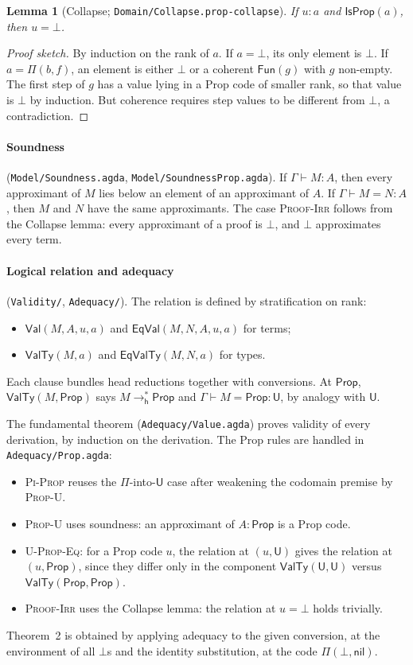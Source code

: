\documentclass[11pt]{article}
\newcommand{\U}{\mathsf{U}}
\newcommand{\Prop}{\mathsf{Prop}}
\newcommand{\ty}[3]{#1 \vdash #2 : #3}
\newcommand{\cv}[4]{#1 \vdash #2 = #3 : #4}
\newcommand{\hr}{\mathrel{\to^{*}_{\mathsf{h}}}}
\newcommand{\code}[1]{\mathsf{#1}}
\newcommand{\IsProp}{\mathsf{IsProp}}
\newcommand{\agda}[1]{\texttt{#1}}
\theoremstyle{plain}
\newtheorem{lemma}[theorem]{Lemma}
\theoremstyle{remark}
\begin{document}
\begin{lemma}[Collapse; \agda{Domain/Collapse.prop-collapse}]
If $u : a$ and $\IsProp(a)$, then $u = \bot$.
\end{lemma}
\begin{proof}[Proof sketch]
By induction on the rank of $a$. If $a = \bot$, its only element is $\bot$.
If $a = \Pi(b, f)$, an element is either $\bot$ or a coherent $\code{Fun}(g)$
with $g$ non-empty. The first step of $g$ has a value lying in a Prop code of
smaller rank, so that value is $\bot$ by induction. But coherence requires
step values to be different from $\bot$, a contradiction.
\end{proof}

\paragraph{Soundness} (\agda{Model/Soundness.agda}, \agda{Model/SoundnessProp.agda}).
If $\ty{\Gamma}{M}{A}$, then every approximant of $M$ lies below an element
of an approximant of $A$. If $\cv{\Gamma}{M}{N}{A}$, then $M$ and $N$ have the
same approximants. The case \textsc{Proof-Irr} follows from the Collapse
lemma: every approximant of a proof is $\bot$, and $\bot$ approximates
every term.

\paragraph{Logical relation and adequacy}
(\agda{Validity/}, \agda{Adequacy/}). The relation is defined by
stratification on rank:
\begin{itemize}
\item $\mathsf{Val}(M, A, u, a)$ and $\mathsf{EqVal}(M, N, A, u, a)$ for terms;
\item $\mathsf{ValTy}(M, a)$ and $\mathsf{EqValTy}(M, N, a)$ for types.
\end{itemize}
Each clause bundles head reductions together with conversions. At
$\code{Prop}$, $\mathsf{ValTy}(M, \code{Prop})$ says $M \hr \Prop$ and
$\cv{\Gamma}{M}{\Prop}{\U}$, by analogy with $\code{U}$.

The fundamental theorem (\agda{Adequacy/Value.agda}) proves validity of every
derivation, by induction on the derivation. The Prop rules are handled in
\agda{Adequacy/Prop.agda}:
\begin{itemize}
\item \textsc{Pi-Prop} reuses the $\Pi$-into-$\U$ case after weakening the
  codomain premise by \textsc{Prop-U}.
\item \textsc{Prop-U} uses soundness: an approximant of $A : \Prop$ is a
  Prop code.
\item \textsc{U-Prop-Eq}: for a Prop code $u$, the relation at
  $(u, \code{U})$ gives the relation at $(u, \code{Prop})$, since they
  differ only in the component $\mathsf{ValTy}(\U,\code{U})$ versus
  $\mathsf{ValTy}(\Prop,\code{Prop})$.
\item \textsc{Proof-Irr} uses the Collapse lemma: the relation at $u = \bot$
  holds trivially.
\end{itemize}
Theorem~2 is obtained by applying adequacy to the given conversion, at the
environment of all $\bot$s and the identity substitution, at the code
$\Pi(\bot, \mathsf{nil})$.
\end{document}
